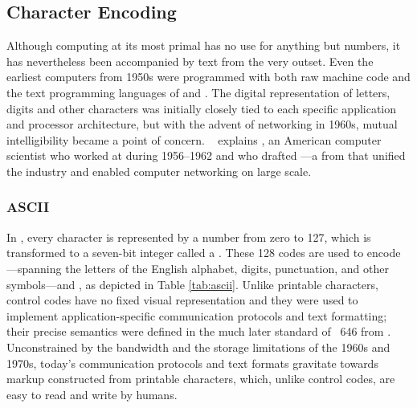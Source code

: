 \documentclass[
  a5paper,10pt,           %
  dvipsnames              %
]{book}
\begin{document}
\subsection{Character Encoding}
Although computing at its most primal has no use for anything but numbers, it
has nevertheless been accompanied by text from the very outset. Even the
earliest computers from 1950s were programmed with both raw machine code and
the text programming languages of  and . The
digital representation of letters, digits and other characters was initially
closely tied to each specific application and processor architecture, but with
the advent of networking in 1960s, mutual intelligibility became a point of
concern.
\  explains \cite{brandel99}
, an American computer scientist who worked at 
during 1956--1962 and who drafted ---a
 from \citeyear{asa63} that unified the industry and
enabled computer networking on large scale.

\subsubsection{ASCII}
In , every character is represented by a number from zero to 127,
which is transformed to a seven-bit integer called a .
These 128 codes are used to encode ---spanning the
letters of the English alphabet, digits, punctuation, and other symbols---and
, as depicted in Table \ref{tab:ascii}.  Unlike printable
characters, control codes have no fixed visual representation and they were used
to implement application-specific communication protocols and text formatting;
their precise semantics were defined in the much later standard of
~646 from \citeyear{iso72} \cite{iso72}. Unconstrained by the
bandwidth and the storage limitations of the 1960s and 1970s, today's
communication protocols and text formats gravitate towards markup constructed
from printable characters, which, unlike control codes, are easy to read and
write by humans.
\end{document}
